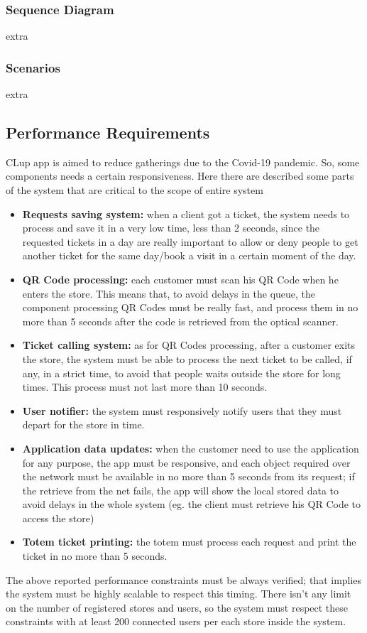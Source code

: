 \documentclass{article}
\begin{document}
		\subsubsection{Sequence Diagram}
		extra
		\subsubsection{Scenarios}
		extra
	\subsection{Performance Requirements}
	CLup app is aimed to reduce gatherings due to the Covid-19 pandemic. So, some components needs a certain responsiveness. Here there are described some parts of the system that are critical to the scope of entire system
	\begin{itemize}
		\item {\bfseries Requests saving system:} when a client got a ticket, the system needs to process and save it in a very low time, less than 2 seconds,  since the requested tickets in a day are really important to allow or deny people to get another ticket for the same day/book a visit in a certain moment of the day.  
		\item {\bfseries QR Code processing:} each customer must scan his QR Code when he enters the store. This means that, to avoid delays in the queue, the component processing QR Codes must be really fast, and process them in no more than 5 seconds after the code is retrieved from the optical scanner.
		\item {\bfseries Ticket calling system:} as for QR Codes processing, after a customer exits the store, the system must be able to process the next ticket to be called, if any, in a strict time, to avoid that people waits outside the store for long times. This process must not last more than 10 seconds.
		\item {\bfseries User notifier: } the system must responsively notify users that they must depart for the store in time. 
		\item{\bfseries Application data updates: } when the customer need to use the application for any purpose, the app must be responsive, and each object required over the network must be available in no more than 5 seconds from its request; if the retrieve from the net fails, the app will show the local stored data to avoid delays in the whole system (eg. the client must retrieve his QR Code to access the store) 
		\item{\bfseries Totem ticket printing: } the totem must process each request and print the ticket in no more than 5 seconds.
	\end{itemize} 
The above reported performance constraints must be always verified; that implies the system must be highly scalable to respect this timing. There isn't any limit on the number of registered stores and users, so the system must respect these constraints with at least 200 connected users per each store inside the system.
\end{document}
